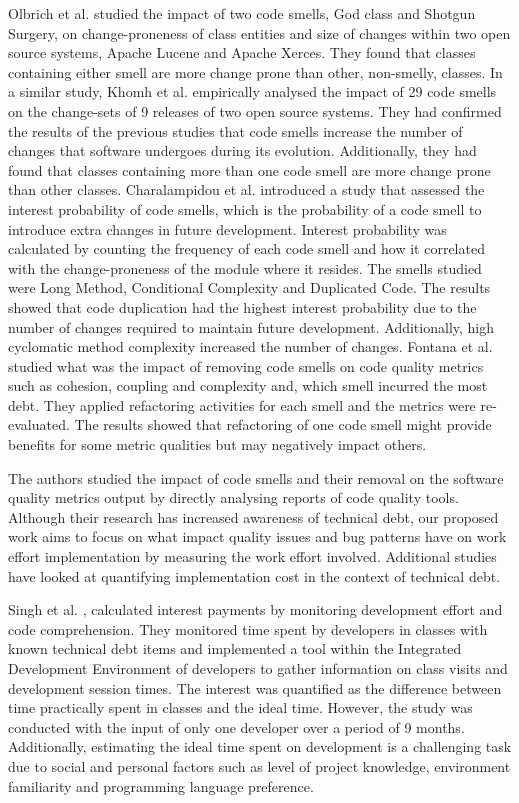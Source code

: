 \documentclass{mpaper}
\begin{document}
Olbrich et al. \cite{Olbrich2009} studied the impact of two code smells, God
class and Shotgun Surgery, on change-proneness of class entities and size of
changes within two open source systems, Apache Lucene and Apache Xerces. They
found that classes containing either smell are more change prone than other,
non-smelly, classes. In a similar study, Khomh et al. \cite{Khomh2009}
empirically analysed the impact of 29 code smells on the change-sets of 9
releases of two open source systems. They had confirmed the results of the
previous studies that code smells increase the number of changes that software
undergoes during its evolution. Additionally, they had found that classes
containing more than one code smell are more change prone than other classes.
Charalampidou et al. \cite{Charalampidou2017} introduced a study that assessed
the interest probability of code smells, which is the probability of a code
smell to introduce extra changes in future development. Interest probability was
calculated by counting the frequency of each code smell and how it correlated
with the change-proneness of the module where it resides. The smells studied
were Long Method, Conditional Complexity and Duplicated Code. The results showed
that code duplication had the highest interest probability due to the number of
changes required to maintain future development. Additionally, high cyclomatic
method complexity increased the number of changes. Fontana et al.
\cite{Fontana2012} studied what was the impact of removing code smells on code
quality metrics such as cohesion, coupling and complexity and, which smell
incurred the most debt. They applied refactoring activities for each smell and
the metrics were re-evaluated. The results showed that refactoring of one code
smell might provide benefits for some metric qualities but may negatively impact
others.

The authors studied the impact of code smells and their removal on the software
quality metrics output by directly analysing reports of code quality tools.
Although their research has increased awareness of technical debt, our proposed
work aims to focus on what impact quality issues and bug patterns have on work
effort implementation by measuring the work effort involved. Additional studies
have looked at quantifying implementation cost in the context of technical debt.

Singh et al. \cite{Singh2014}, calculated interest payments by monitoring
development effort and code comprehension. They monitored time spent by
developers in classes with known technical debt items and implemented a tool
within the Integrated Development Environment of developers to gather
information on class visits and development session times. The interest was
quantified as the difference between time practically spent in classes and the
ideal time. However, the study was conducted with the input of only one
developer over a period of 9 months. Additionally, estimating the ideal time
spent on development is a challenging task due to social and personal factors
such as level of project knowledge, environment familiarity and programming
language preference.
\end{document}
